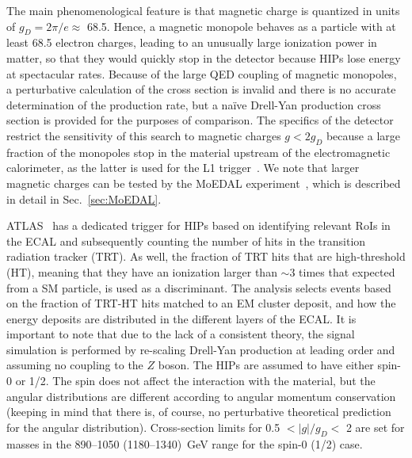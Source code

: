 The main phenomenological feature is that magnetic charge is quantized in units of $g_D = 2\pi/e \approx$ 68.5. Hence, a magnetic monopole behaves as a particle with at least 68.5 electron charges, leading to an unusually large ionization power in matter, so that they would quickly stop in the detector because HIPs lose energy at spectacular rates. Because of the large QED coupling of magnetic monopoles, a perturbative calculation of the cross section is invalid and there is no accurate determination of the production rate, but a na\"ive Drell-Yan production cross section is provided for the purposes of comparison. The specifics of the detector restrict the sensitivity of this search to magnetic charges $g < 2 g_D$ because a large fraction of the monopoles stop in the material upstream of the electromagnetic calorimeter, as the latter is used for the L1 trigger~\cite{DeRoeck:2011aa}. We note that larger magnetic charges can be tested by the MoEDAL experiment~\cite{MoEDAL:2016jlb}, which is described in detail in Sec.~\ref{sec:MoEDAL}.

ATLAS~\cite{Aad:2015kta} has a dedicated trigger for HIPs based on identifying relevant RoIs in the ECAL and subsequently counting the number of hits in the transition radiation tracker (TRT). As well, the fraction of TRT hits that are high-threshold (HT), meaning that they have an ionization larger than $\sim3$ times that expected from a SM particle, is used as a discriminant. The analysis selects events based on the fraction of TRT-HT hits matched to an EM cluster deposit, and how the energy deposits are distributed in the different layers of the ECAL. It is important to note that due to the lack of a consistent theory, the signal simulation is performed by re-scaling Drell-Yan production at leading order and assuming no coupling to the $Z$ boson. The HIPs are assumed to have either spin-0 or 1/2. The spin does not affect the interaction with the material, but the angular distributions are different according to angular momentum conservation (keeping in mind that there is, of course, no perturbative theoretical prediction for the angular distribution). Cross-section limits for 0.5 $< |g|/g_D <$ 2 are set for masses in the 890--1050 (1180--1340)~GeV range for the spin-0 (1/2) case.


